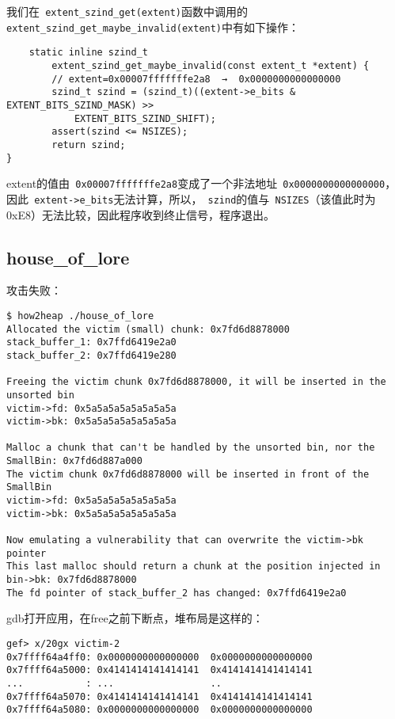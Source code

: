 我们在\verb+ extent_szind_get(extent)+函数中调用的\verb+ extent_szind_get_maybe_invalid(extent)+中有如下操作：
\begin{verbatim}
    static inline szind_t
        extent_szind_get_maybe_invalid(const extent_t *extent) {
        // extent=0x00007fffffffe2a8  →  0x0000000000000000
        szind_t szind = (szind_t)((extent->e_bits & EXTENT_BITS_SZIND_MASK) >>
            EXTENT_BITS_SZIND_SHIFT);
        assert(szind <= NSIZES);
        return szind;
}

\end{verbatim}

extent的值由\verb+ 0x00007fffffffe2a8+变成了一个非法地址\verb+ 0x0000000000000000+，因此\verb+ extent->e_bits+无法计算，所以，\verb+ szind+的值与\verb+ NSIZES+（该值此时为0xE8）无法比较，因此程序收到终止信号，程序退出。

\subsection{house\_of\_lore}

攻击失败：
\begin{verbatim}
$ how2heap ./house_of_lore 
Allocated the victim (small) chunk: 0x7fd6d8878000
stack_buffer_1: 0x7ffd6419e2a0
stack_buffer_2: 0x7ffd6419e280

Freeing the victim chunk 0x7fd6d8878000, it will be inserted in the unsorted bin
victim->fd: 0x5a5a5a5a5a5a5a5a
victim->bk: 0x5a5a5a5a5a5a5a5a

Malloc a chunk that can't be handled by the unsorted bin, nor the SmallBin: 0x7fd6d887a000
The victim chunk 0x7fd6d8878000 will be inserted in front of the SmallBin
victim->fd: 0x5a5a5a5a5a5a5a5a
victim->bk: 0x5a5a5a5a5a5a5a5a

Now emulating a vulnerability that can overwrite the victim->bk pointer
This last malloc should return a chunk at the position injected in bin->bk: 0x7fd6d8878000
The fd pointer of stack_buffer_2 has changed: 0x7ffd6419e2a0

\end{verbatim}

gdb打开应用，在free之前下断点，堆布局是这样的：
\begin{verbatim}
gef> x/20gx victim-2
0x7ffff64a4ff0: 0x0000000000000000  0x0000000000000000
0x7ffff64a5000: 0x4141414141414141  0x4141414141414141
...           : ...                 ..
0x7ffff64a5070: 0x4141414141414141  0x4141414141414141
0x7ffff64a5080: 0x0000000000000000  0x0000000000000000
\end{verbatim}

